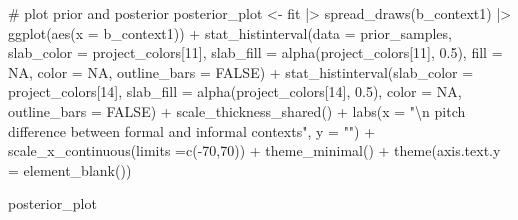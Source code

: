 \documentclass[
  doc,
  floatsintext,
  longtable,
  nolmodern,
  notxfonts,
  notimes,
  colorlinks=true,linkcolor=blue,citecolor=blue,urlcolor=blue]{apa7}
\newenvironment{Shaded}{\begin{snugshade}}{\end{snugshade}}
\newcommand{\AttributeTok}[1]{\textcolor[rgb]{0.40,0.45,0.13}{#1}}
\newcommand{\CommentTok}[1]{\textcolor[rgb]{0.37,0.37,0.37}{#1}}
\newcommand{\ConstantTok}[1]{\textcolor[rgb]{0.56,0.35,0.01}{#1}}
\newcommand{\DecValTok}[1]{\textcolor[rgb]{0.68,0.00,0.00}{#1}}
\newcommand{\FloatTok}[1]{\textcolor[rgb]{0.68,0.00,0.00}{#1}}
\newcommand{\FunctionTok}[1]{\textcolor[rgb]{0.28,0.35,0.67}{#1}}
\newcommand{\NormalTok}[1]{\textcolor[rgb]{0.00,0.23,0.31}{#1}}
\newcommand{\OtherTok}[1]{\textcolor[rgb]{0.00,0.23,0.31}{#1}}
\newcommand{\SpecialCharTok}[1]{\textcolor[rgb]{0.37,0.37,0.37}{#1}}
\newcommand{\StringTok}[1]{\textcolor[rgb]{0.13,0.47,0.30}{#1}}
\begin{document}
\begin{Shaded}
\begin{Highlighting}[]
\CommentTok{\# plot prior and posterior}
\NormalTok{posterior\_plot }\OtherTok{\textless{}{-}}\NormalTok{ fit }\SpecialCharTok{|\textgreater{}} 
  \FunctionTok{spread\_draws}\NormalTok{(b\_context1) }\SpecialCharTok{|\textgreater{}} 
  \FunctionTok{ggplot}\NormalTok{(}\FunctionTok{aes}\NormalTok{(}\AttributeTok{x =}\NormalTok{ b\_context1)) }\SpecialCharTok{+} 
    \FunctionTok{stat\_histinterval}\NormalTok{(}\AttributeTok{data =}\NormalTok{ prior\_samples,}
                     \AttributeTok{slab\_color =}\NormalTok{ project\_colors[}\DecValTok{11}\NormalTok{],}
                     \AttributeTok{slab\_fill =} \FunctionTok{alpha}\NormalTok{(project\_colors[}\DecValTok{11}\NormalTok{], }\FloatTok{0.5}\NormalTok{),}
                     \AttributeTok{fill =} \ConstantTok{NA}\NormalTok{,}
                     \AttributeTok{color =} \ConstantTok{NA}\NormalTok{,}
                     \AttributeTok{outline\_bars =} \ConstantTok{FALSE}\NormalTok{) }\SpecialCharTok{+}
    \FunctionTok{stat\_histinterval}\NormalTok{(}\AttributeTok{slab\_color =}\NormalTok{ project\_colors[}\DecValTok{14}\NormalTok{],}
                      \AttributeTok{slab\_fill =} \FunctionTok{alpha}\NormalTok{(project\_colors[}\DecValTok{14}\NormalTok{], }\FloatTok{0.5}\NormalTok{),}
                      \AttributeTok{color =} \ConstantTok{NA}\NormalTok{,}
                      \AttributeTok{outline\_bars =} \ConstantTok{FALSE}\NormalTok{) }\SpecialCharTok{+}
  \FunctionTok{scale\_thickness\_shared}\NormalTok{() }\SpecialCharTok{+}
  \FunctionTok{labs}\NormalTok{(}\AttributeTok{x =} \StringTok{"}\SpecialCharTok{\textbackslash{}n}\StringTok{ pitch difference between formal and informal contexts"}\NormalTok{,}
       \AttributeTok{y =} \StringTok{""}\NormalTok{) }\SpecialCharTok{+}
  \FunctionTok{scale\_x\_continuous}\NormalTok{(}\AttributeTok{limits =}\FunctionTok{c}\NormalTok{(}\SpecialCharTok{{-}}\DecValTok{70}\NormalTok{,}\DecValTok{70}\NormalTok{)) }\SpecialCharTok{+}
  \FunctionTok{theme\_minimal}\NormalTok{() }\SpecialCharTok{+}
  \FunctionTok{theme}\NormalTok{(}\AttributeTok{axis.text.y =} \FunctionTok{element\_blank}\NormalTok{())}

\NormalTok{posterior\_plot}
\end{Highlighting}
\end{Shaded}
\end{document}
